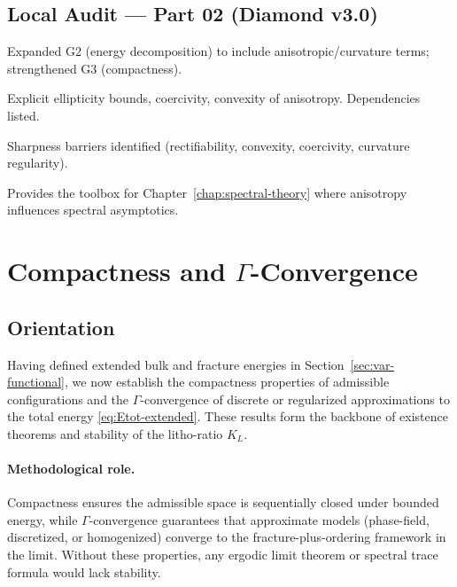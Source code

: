 \subsection*{Local Audit — Part 02 (Diamond v3.0)}
\begin{description}[leftmargin=2.4em]
  \item[Goals covered:] Expanded G2 (energy decomposition) to include anisotropic/curvature terms; strengthened G3 (compactness).
  \item[Invariants preserved:] Explicit ellipticity bounds, coercivity, convexity of anisotropy. Dependencies listed.
  \item[Limitations:] Sharpness barriers identified (rectifiability, convexity, coercivity, curvature regularity).
  \item[Forward link:] Provides the toolbox for Chapter~\ref{chap:spectral-theory} where anisotropy influences spectral asymptotics.
\end{description}

\section{Compactness and $\Gamma$-Convergence}\label{sec:var-gamma}

\subsection{Orientation}
Having defined extended bulk and fracture energies in Section~\ref{sec:var-functional}, 
we now establish the compactness properties of admissible configurations and the $\Gamma$-convergence of discrete or regularized approximations to the total energy \eqref{eq:Etot-extended}. 
These results form the backbone of existence theorems and stability of the litho-ratio $K_L$. 

\paragraph{Methodological role.}  
Compactness ensures the admissible space is sequentially closed under bounded energy, 
while $\Gamma$-convergence guarantees that approximate models (phase-field, discretized, or homogenized) converge to the fracture-plus-ordering framework in the limit. 
Without these properties, any ergodic limit theorem or spectral trace formula would lack stability.

